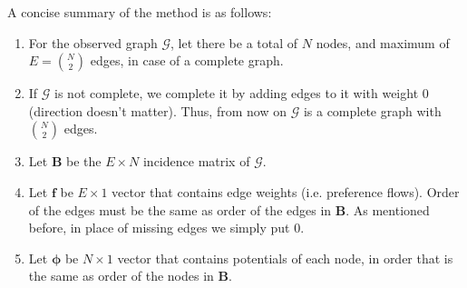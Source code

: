 \documentclass[letterpaper, 10 pt, conference]{ieeeconf}
\newcommand{\matr}[1]{\mathbold{#1}}
\newcommand{\graph}[1]{\mathcal{#1}}
\begin{document}
  A concise summary of the method is as follows:
  \begin{enumerate}
    \item For the observed graph $\graph{G}$, let there be a total of $N$ nodes, and maximum of $E = \binom{N}{2}$ edges, in case of a complete graph.
    
    \item If $\graph{G}$ is not complete, we complete it by adding edges to it with weight 0 (direction doesn't matter).
    Thus, from now on $\graph{G}$ is a complete graph with $\binom{N}{2}$ edges.
    
    \item Let $\matr{B}$ be the $E \times N$ incidence matrix of $\graph{G}$.

    \item Let $\matr{f}$ be $E \times 1$ vector that contains edge weights (i.e. preference flows).
    Order of the edges must be the same as order of the edges in $\matr{B}$.
    As mentioned before, in place of missing edges we simply put 0.
    
    \item Let $\matr{\phi}$ be $N \times 1$ vector that contains potentials of each node, in order that is the same as order of the nodes in $\matr{B}$.
    

\end{enumerate}
\end{document}
